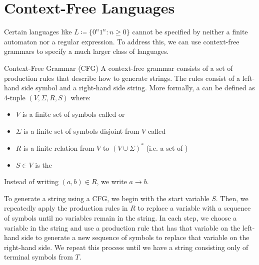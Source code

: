 \documentclass[12pt]{report}
\begin{document}
\chapter{Context-Free Languages}
Certain languages like $L \coloneq \{ 0^n 1^n : n \geq 0 \}$ cannot be specified by neither a finite automaton nor a regular expression. To address this, we can use context-free grammars to specify a much larger class of languages.

\begin{dfnbox}{Context-Free Grammar (CFG)}{}
    A context-free grammar consists of a set of production rules that describe how to generate strings. The rules consist of a left-hand side symbol and a right-hand side string.
    \tcblower
    More formally, a  can be defined as 4-tuple $(V, \Sigma, R, S)$ where:
    \begin{itemize}[noitemsep]
        \item $V$ is a finite set of symbols called  or 
        \item $\Sigma$ is a finite set of symbols disjoint from $V$ called 
        \item $R$ is a finite relation from $V$ to $(V \cup \Sigma)^*$ (i.e. a set of )
        \item $S \in V$ is the 
    \end{itemize}
    Instead of writing $(a, b) \in R$, we write $a \to b$.
\end{dfnbox}

To generate a string using a CFG, we begin with the start variable $S$. Then, we repeatedly apply the production rules in $R$ to replace a variable with a sequence of symbols until no variables remain in the string. In each step, we choose a variable in the string and use a production rule that has that variable on the left-hand side to generate a new sequence of symbols to replace that variable on the right-hand side. We repeat this process until we have a string consisting only of terminal symbols from $T$.

\end{document}
